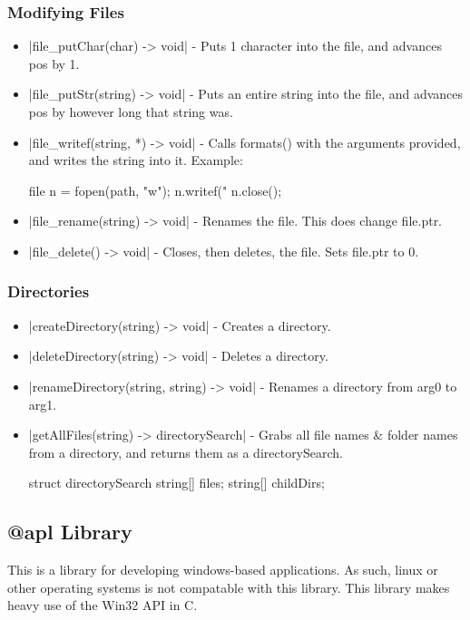 \documentclass[12pt, letterpaper, oneside]{article}
\begin{document}
	\subsubsection{Modifying Files}
		\begin{itemize}
			\item[--] \spverb|file_putChar(char) -> void| - Puts 1 character into the file, and advances pos by 1.
			\item[--] \spverb|file_putStr(string) -> void| - Puts an entire string into the file, and advances pos by however long that string was.
			\item[--] \spverb|file_writef(string, *) -> void| - Calls formats() with the arguments provided, and writes the string into it. Example:
			
			\begin{spverbatim}
				file n = fopen(path, "w");
				n.writef("%
				n.close();
			\end{spverbatim}
			\newline
			\item[--] \spverb|file_rename(string) -> void| - Renames the file. This does change file.ptr.
			\item[--] \spverb|file_delete() -> void| - Closes, then deletes, the file. Sets file.ptr to 0.
		\end{itemize}
	\subsubsection{Directories}
		\begin{itemize}
			\item[--] \spverb|createDirectory(string) -> void| - Creates a directory.
			\item[--] \spverb|deleteDirectory(string) -> void| - Deletes a directory.
			\item[--] \spverb|renameDirectory(string, string) -> void| - Renames a directory from arg0 to arg1.
			\item[--] \spverb|getAllFiles(string) -> directorySearch| - Grabs all file names \& folder names from a directory, and returns them as a directorySearch.
			
			
			\begin{spverbatim}
				struct directorySearch {
					string[] files;
					string[] childDirs;
				}
			\end{spverbatim}
		\end{itemize}
	\subsection{@apl Library}
		This is a library for developing windows-based applications. As such, linux or other operating systems is not compatable with this library. This library makes heavy use of the Win32 API in C.
\end{document}
